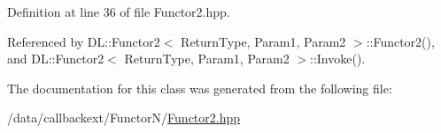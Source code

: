 Definition at line 36 of file Functor2.hpp.

Referenced by DL::Functor2$<$ Return\-Type, Param1, Param2 $>$::Functor2(), and DL::Functor2$<$ Return\-Type, Param1, Param2 $>$::Invoke().

The documentation for this class was generated from the following file:\begin{CompactItemize}
\item 
/data/callbackext/Functor\-N/\hyperlink{Functor2_8hpp}{Functor2.hpp}\end{CompactItemize}

